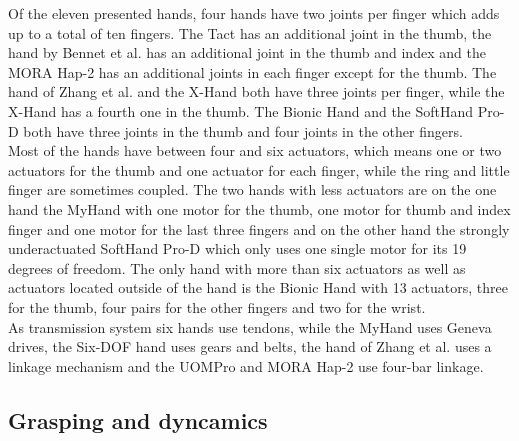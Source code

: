\documentclass[a4paper, 10pt, conference]{ieeeconf}      %
\begin{document}
Of the eleven presented hands, four hands have two joints per finger which adds up to a total of ten fingers. The Tact has an additional joint in the thumb, the hand by Bennet et al. has an additional joint in the thumb and index and the MORA Hap-2 has an additional joints in each finger except for the thumb. The hand of Zhang et al. and the X-Hand both have three joints per finger, while the X-Hand has a fourth one in the thumb. The Bionic Hand and the SoftHand Pro-D both have three joints in the thumb and four joints in the other fingers.\\
Most of the hands have between four and six actuators, which means one or two actuators for the thumb and one actuator for each finger, while the ring and little finger are sometimes coupled. The two hands with less actuators are on the one hand the MyHand with one motor for the thumb, one motor for thumb and index finger and one motor for the last three fingers and on the other hand the strongly underactuated SoftHand Pro-D which only uses one single motor for its 19 degrees of freedom. The only hand with more than six actuators as well as actuators located outside of the hand is the Bionic Hand with 13 actuators, three for the thumb, four pairs for the other fingers and two for the wrist.\\
As transmission system six hands use tendons, while the MyHand uses Geneva drives, the Six-DOF hand uses gears and belts, the hand of Zhang et al. uses a linkage mechanism and the UOMPro and MORA Hap-2 use four-bar linkage.

\subsection{Grasping and dyncamics}
\end{document}
